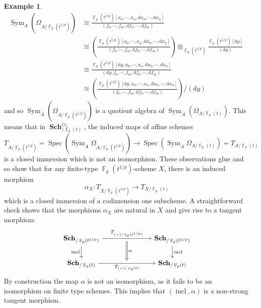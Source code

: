 \documentclass{amsart}
\theoremstyle{definition}
\newtheorem{example}[equation]{Example}
\DeclareMathOperator{\Fbb}{\mathbb{F}}
\DeclareMathOperator{\sym}{Sym}
\DeclareMathOperator{\Spec}{Spec}
\newcommand{\Sym}[1]{\sym_{#1}}
\DeclareMathOperator{\Sch}{\mathbf{Sch}}
\newcommand{\Kah}[2]{\Omega_{{#1}/{#2}}}
\numberwithin{equation}{subsection}
\begin{document}
\begin{example}
	\begin{align*}
		\Sym{A}\left(\Kah{A}{\Fbb_p(t^{1/p})}\right) &\cong \frac{\Fbb_p(t^{1/p})[x_0, \cdots, x_n, \mathrm{d}x_0, \cdots, \mathrm{d}x_n]}{(f_0, \cdots, f_m, \mathrm{d}f_0, \cdots, \mathrm{d}f_m)} \\
		&\cong \left(\frac{\Fbb_p(t^{1/p})[x_0, \cdots, x_n, \mathrm{d}x_0, \cdots, \mathrm{d}x_n]}{(f_0, \cdots, f_m, \mathrm{d}f_0, \cdots, \mathrm{d}f_m)}\right) \otimes_{\Fbb_{p}(t^{1/p})} \frac{\Fbb_p(t^{1/p})[\mathrm{d}y]}{(\mathrm{d}y)} \ \\
		&\cong \frac{\Fbb_p(t^{1/p})[\mathrm{d}y, x_0, \cdots, x_n, \mathrm{d}x_0, \cdots, \mathrm{d}x_n]}{(\mathrm{d}y, f_0, \cdots, f_m, \mathrm{d}f_0, \cdots, \mathrm{d}f_m)} \\
		&\cong \left(\frac{\Fbb_p(t^{1/p})[\mathrm{d}y, x_0, \cdots, x_n, \mathrm{d}x_0, \cdots, \mathrm{d}x_n]}{(f_0, \cdots, f_m, \mathrm{d}f_0, \cdots, \mathrm{d}f_m)}\right)/(\mathrm{d}y)
	\end{align*}
	and so $\Sym{A}(\Kah{A}{\Fbb_p(t^{1/p})})$ is a quotient algebra of $\Sym{A}(\Kah{A}{\Fbb_p(t)})$. This means that in $\Sch^{\operatorname{f.t.}}_{/\Fbb_{p}(t)}$, the induced maps of affine schemes
	\[
	T_{A/\Fbb_p(t^{1/p})} = \Spec\left(\Sym{A}\Kah{A}{\Fbb_p(t^{1/p})}\right) \longrightarrow \Spec\left(\Sym{A}\Kah{A}{\Fbb_p(t)}\right) = T_{A/\Fbb_p(t)}
	\]
	is a closed immersion which is not an isomorphism. These observations glue and so show that for any finite-type $\Fbb_p(t^{1/p})$-scheme $X$, there is an induced morphism
	\[
	\alpha_X:T_{X/\Fbb_p(t^{1/p})} \to T_{X/\Fbb_p(t)}
	\]
	which is a closed immersion of a codimension one subscheme. A straightforward check shows that the morphisms $\alpha_X$ are natural in $X$ and give rise to a tangent morphism:
	\[
	\begin{tikzcd}
		\Sch_{/\Fbb_p(t^{1/p})} \ar[rrr, ""{name = U}]{}{T_{(-)/\Fbb_p(t^{1/p})}} \ar[d, swap]{}{\operatorname{incl}} &  & &\Sch_{/\Fbb_p(t^{1/p})} \ar[d]{}{\operatorname{incl}} \\
		\Sch_{/\Fbb_p(t)} \ar[rrr, swap, ""{name = D}]{}{T_{(-)/\Fbb_p(t)}} & & & \Sch_{/\Fbb_p(t)}
		\ar[from = U, to = D, Rightarrow, shorten <= 4pt, shorten >= 4pt]{}{\alpha}
	\end{tikzcd}
	\]
	By construction the map $\alpha$ is not an isomorphism, as it fails to be an isomorphism on finite type schemes. This implies that $(\operatorname{incl},\alpha)$ is a non-strong tangent morphism.
	
\end{example}
\end{document}
